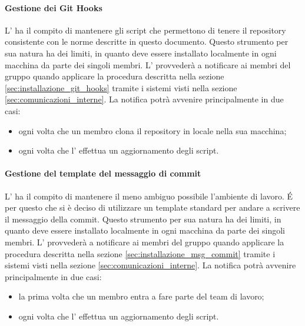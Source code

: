			\paragraph{Gestione dei Git Hooks}
			L'\roleAdministrator{} ha il compito di mantenere gli script che permettono di tenere il repository consistente con le norme descritte in questo documento. \newline
			Questo strumento per sua natura ha dei limiti, in quanto deve essere installato localmente in ogni macchina da parte dei singoli membri. \newline
			L'\roleAdministrator{} provvederà a notificare ai membri del gruppo quando applicare la procedura descritta nella sezione \ref{sec:installazione_git_hooks} tramite i sistemi visti nella sezione \ref{sec:comunicazioni_interne}. \newline
			La notifica potrà avvenire principalmente in due casi:
				\begin{itemize}
					\item ogni volta che un membro clona il repository in locale nella sua macchina;
					\item ogni volta che l'\roleAdministrator{} effettua un aggiornamento degli script.
				\end{itemize}

			\paragraph{Gestione del template del messaggio di commit}
			L'\roleAdministrator{} ha il compito di mantenere il meno ambiguo possibile l'ambiente di lavoro. \'E per questo che si è deciso di utilizzare un template standard per andare a scrivere il messaggio della commit.
			Questo strumento per sua natura ha dei limiti, in quanto deve essere installato localmente in ogni macchina da parte dei singoli membri. \newline
			L'\roleAdministrator{} provvederà a notificare ai membri del gruppo quando applicare la procedura descritta nella sezione \ref{sec:installazione_msg_commit} tramite i sistemi visti nella sezione \ref{sec:comunicazioni_interne}. \newline
			La notifica potrà avvenire principalmente in due casi:
				\begin{itemize}
					\item la prima volta che un membro entra a fare parte del team di lavoro;
					\item ogni volta che l'\roleAdministrator{} effettua un aggiornamento degli script.
				\end{itemize}

